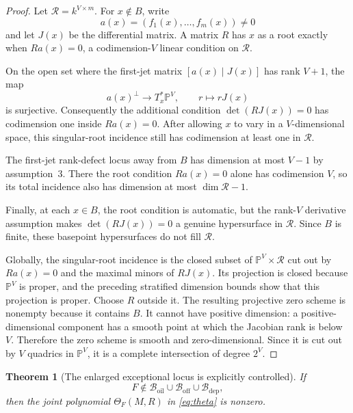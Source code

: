 \documentclass[10pt,a4paper]{article}
\newtheorem{theorem}{Theorem}[section]
\newcommand{\PP}{\mathbb P}
\newcommand{\cB}{\mathcal B}
\newcommand{\cR}{\mathcal R}
\newcommand{\oil}{\mathrm{oil}}
\newcommand{\off}{\mathrm{off}}
\newcommand{\dep}{\mathrm{dep}}
\begin{document}
\begin{proof}
Let $\cR=k^{V\times m}$.  For $x\notin B$, write
\[
a(x)=(f_1(x),\ldots,f_m(x))\ne0
\]
and let $J(x)$ be the differential matrix.  A matrix $R$ has $x$ as a root exactly when $Ra(x)=0$, a codimension-$V$ linear condition on $\cR$.

On the open set where the first-jet matrix $[a(x)\mid J(x)]$ has rank $V+1$, the map
\[
a(x)^\perp\longrightarrow T_x^*\PP^V,
\qquad
r\longmapsto rJ(x)
\]
is surjective.  Consequently the additional condition $\det(RJ(x))=0$ has codimension one inside $Ra(x)=0$.  After allowing $x$ to vary in a $V$-dimensional space, this singular-root incidence still has codimension at least one in $\cR$.

The first-jet rank-defect locus away from $B$ has dimension at most $V-1$ by assumption~3.  There the root condition $Ra(x)=0$ alone has codimension $V$, so its total incidence also has dimension at most $\dim\cR-1$.

Finally, at each $x\in B$, the root condition is automatic, but the rank-$V$ derivative assumption makes $\det(RJ(x))=0$ a genuine hypersurface in $\cR$.  Since $B$ is finite, these basepoint hypersurfaces do not fill $\cR$.

Globally, the singular-root incidence is the closed subset of $\PP^V\times\cR$ cut out by $Ra(x)=0$ and the maximal minors of $RJ(x)$.  Its projection is closed because $\PP^V$ is proper, and the preceding stratified dimension bounds show that this projection is proper.  Choose $R$ outside it.  The resulting projective zero scheme is nonempty because it contains $B$.  It cannot have positive dimension: a positive-dimensional component has a smooth point at which the Jacobian rank is below $V$.  Therefore the zero scheme is smooth and zero-dimensional.  Since it is cut out by $V$ quadrics in $\PP^V$, it is a complete intersection of degree $2^V$.
\end{proof}

\begin{theorem}[The enlarged exceptional locus is explicitly controlled]\label{thm:joint-nonzero}
If
\[
F\notin\cB_{\oil}\cup\cB_{\off}\cup\cB_{\dep},
\]
then the joint polynomial $\Theta_F(M,R)$ in \eqref{eq:theta} is nonzero.
\end{theorem}
\end{document}
